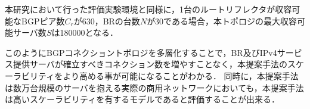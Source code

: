 本研究において行った評価実験環境と同様に，1台のルートリフレクタが収容可能なBGPピア数$C_r$が630，BRの台数$N$が30である場合，本トポロジの最大収容可能サーバ数$S$は180000となる．

このようにBGPコネクショントポロジを多層化することで，BR及びIPv4サービス提供サーバが確立すべきコネクション数を増やすことなく，本提案手法のスケーラビリティをより高める事が可能になることがわかる．
同時に，本提案手法は数万台規模のサーバを抱える実際の商用ネットワークにおいても，本提案手法は高いスケーラビリティを有するモデルであると評価することが出来る．





